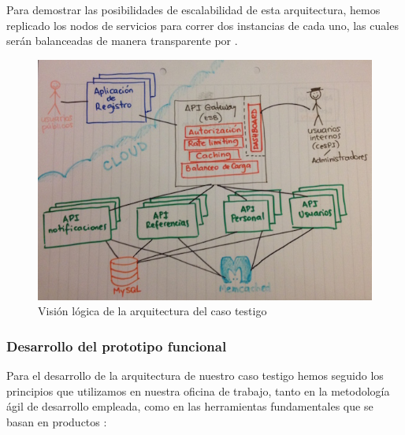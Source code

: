 Para demostrar las posibilidades de escalabilidad de esta arquitectura, hemos replicado los nodos de servicios para correr dos instancias de cada uno, las cuales serán balanceadas de manera transparente por .

\begin{figure}
  \includegraphics[width=\linewidth]{src/images/05-capitulo-5/arquitectura-caso-testigo.jpg}
  \caption{Visión lógica de la arquitectura del caso testigo}
  \label{fig:arquitectura-caso-testigo}
\end{figure}

\subsubsection{Desarrollo del prototipo funcional}

Para el desarrollo de la arquitectura de nuestro caso testigo hemos seguido los principios que utilizamos en nuestra oficina de trabajo, tanto en la metodología ágil de desarrollo empleada, como en las herramientas fundamentales que se basan en productos :

